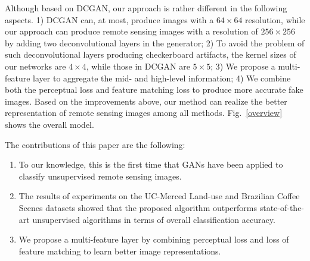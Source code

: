 \documentclass[journal]{IEEEtran}
\begin{document}
Although based on DCGAN, our approach is rather different in the following aspects. 1) DCGAN can, at most, produce images with a $64\times64$ resolution, while our approach can produce remote sensing images with a resolution of $256\times256$ by adding two deconvolutional layers in the generator; 
2) To avoid the problem of such deconvolutional layers producing checkerboard artifacts, the kernel sizes of our networks are $4\times4$, while those in DCGAN are $5\times5$; 3) We propose a multi-feature layer to aggregate the mid- and high-level information; 4) We combine both the perceptual loss and feature matching loss to produce more accurate fake images. Based on the improvements above, our method can realize the better representation of remote sensing images among all methods. Fig.~\ref{overview} shows the overall model.




The contributions of this paper are the following:

\begin{enumerate}
	\item To our knowledge, this is the first time that GANs have been applied to classify unsupervised remote sensing images.
	\item The results of experiments on the UC-Merced Land-use and Brazilian Coffee Scenes datasets showed that the proposed algorithm outperforms state-of-the-art unsupervised algorithms in terms of overall classification accuracy.
	\item We propose a multi-feature layer by combining perceptual loss and loss of feature matching to learn better image representations.
\end{enumerate}


\end{document}
